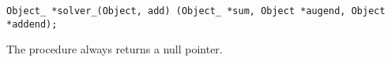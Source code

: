 
\tt{Object_ *solver_(Object, add)%
(Object_ *sum, Object *augend, Object *addend);}


The procedure always returns a null pointer.
